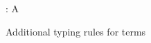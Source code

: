 \begin{figure}
\flushleft {}
\begin{smathpar}
   {
      \Gamma \vdash {} : A
   }
\end{smathpar}
\caption{Additional typing rules for terms}
\end{figure}

